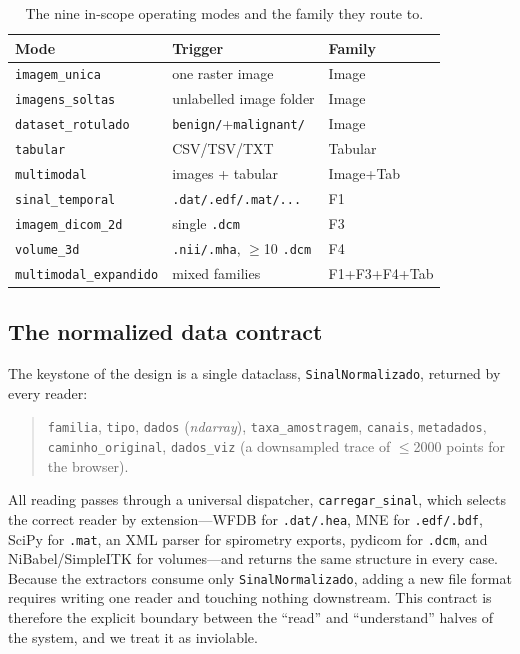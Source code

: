 \documentclass[conference]{IEEEtran}
\begin{document}
\begin{table}[t]
\centering
\caption{The nine in-scope operating modes and the family they route to.}
\label{tab:modes}
\small
\begin{tabular}{@{}lll@{}}
\toprule
Mode & Trigger & Family \\
\midrule
\texttt{imagem\_unica}      & one raster image            & Image \\
\texttt{imagens\_soltas}    & unlabelled image folder     & Image \\
\texttt{dataset\_rotulado}  & \texttt{benign/}+\texttt{malignant/} & Image \\
\texttt{tabular}            & CSV/TSV/TXT                 & Tabular \\
\texttt{multimodal}         & images + tabular            & Image+Tab \\
\texttt{sinal\_temporal}    & \texttt{.dat/.edf/.mat/...}  & F1 \\
\texttt{imagem\_dicom\_2d}  & single \texttt{.dcm}        & F3 \\
\texttt{volume\_3d}         & \texttt{.nii/.mha}, $\geq$10 \texttt{.dcm} & F4 \\
\texttt{multimodal\_expandido} & mixed families           & F1+F3+F4+Tab \\
\bottomrule
\end{tabular}
\end{table}

\subsection{The normalized data contract}
The keystone of the design is a single dataclass, \texttt{SinalNormalizado},
returned by every reader:
\begin{quote}\small
\texttt{familia}, \texttt{tipo}, \texttt{dados} (\emph{ndarray}),
\texttt{taxa\_amostragem}, \texttt{canais}, \texttt{metadados},
\texttt{caminho\_original}, \texttt{dados\_viz} (a downsampled trace of
$\leq$2000 points for the browser).
\end{quote}
All reading passes through a universal dispatcher, \texttt{carregar\_sinal},
which selects the correct reader by extension---WFDB for
\texttt{.dat/.hea}, MNE for \texttt{.edf/.bdf}, SciPy for \texttt{.mat}, an XML
parser for spirometry exports, pydicom for \texttt{.dcm}, and NiBabel/SimpleITK
for volumes---and returns the same structure in every case. Because the
extractors consume only \texttt{SinalNormalizado}, adding a new file format
requires writing one reader and touching nothing downstream. This contract is
therefore the explicit boundary between the ``read'' and ``understand'' halves
of the system, and we treat it as inviolable.
\end{document}

